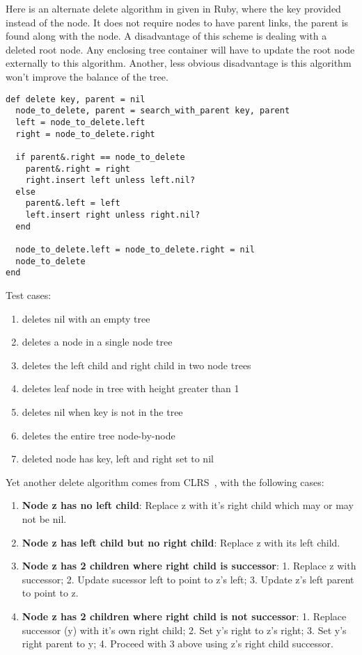 \documentclass{article}
\begin{document}
Here is an alternate delete algorithm in given in Ruby,
where the key provided instead of the node.
It does not require nodes to have parent links, the
parent is found along with the node. A disadvantage of
this scheme is dealing with a deleted root node. Any
enclosing tree container will have to update the
root node externally to this algorithm. Another, less
obvious disadvantage is this algorithm won't improve
the balance of the tree.

\begin{lstlisting}[frame=single]
def delete key, parent = nil
  node_to_delete, parent = search_with_parent key, parent
  left = node_to_delete.left
  right = node_to_delete.right

  if parent&.right == node_to_delete
    parent&.right = right
    right.insert left unless left.nil?
  else
    parent&.left = left
    left.insert right unless right.nil?
  end

  node_to_delete.left = node_to_delete.right = nil
  node_to_delete
end
\end{lstlisting}



Test cases:
\begin{enumerate}
\item deletes nil with an empty tree
\item deletes a node in a single node tree
\item deletes the left child and right child in two node trees
\item deletes leaf node in tree with height greater than 1
\item deletes nil when key is not in the tree
\item deletes the entire tree node-by-node
\item deleted node has key, left and right set to nil
\end{enumerate}

Yet another delete algorithm comes from CLRS~\cite{clrs}, with the following
cases:

\begin{enumerate}
  \item \textbf{Node z has no left child}: Replace z with it's right child
    which may or may not be nil.
  \item \textbf{Node z has left child but no right child}: Replace z with
    its left child.
  \item \textbf{Node z has 2 children where right child is successor}: 1.
    Replace z with successor; 2. Update sucessor left to point to z's left;
    3. Update z's left parent to point to z.
  \item \textbf{Node z has 2 children where right child is not successor}:
    1. Replace successor (y) with it's own right child; 2. Set y's right to
    z's right; 3. Set y's right parent to y; 4. Proceed with 3 above using
    z's right child successor.
\end{enumerate}
\end{document}
